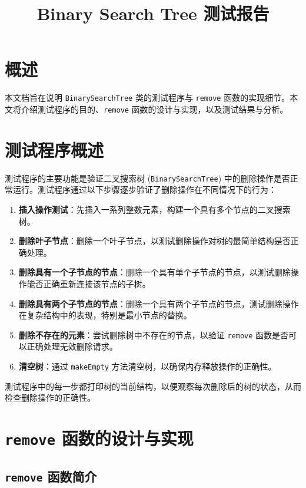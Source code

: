 \documentclass[UTF8]{ctexart}
\title{Binary Search Tree 测试报告}
\author{}
\date{}
\begin{document}
\maketitle

\section{概述}

本文档旨在说明 \texttt{BinarySearchTree} 类的测试程序与 \texttt{remove} 函数的实现细节。本文将介绍测试程序的目的、\texttt{remove} 函数的设计与实现，以及测试结果与分析。

\section{测试程序概述}

测试程序的主要功能是验证二叉搜索树 (\texttt{BinarySearchTree}) 中的删除操作是否正常运行。测试程序通过以下步骤逐步验证了删除操作在不同情况下的行为：

\begin{enumerate}
    \item \textbf{插入操作测试}：先插入一系列整数元素，构建一个具有多个节点的二叉搜索树。
    \item \textbf{删除叶子节点}：删除一个叶子节点，以测试删除操作对树的最简单结构是否正确处理。
    \item \textbf{删除具有一个子节点的节点}：删除一个具有单个子节点的节点，以测试删除操作能否正确重新连接该节点的子树。
    \item \textbf{删除具有两个子节点的节点}：删除一个具有两个子节点的节点，测试删除操作在复杂结构中的表现，特别是最小节点的替换。
    \item \textbf{删除不存在的元素}：尝试删除树中不存在的节点，以验证 \texttt{remove} 函数是否可以正确处理无效删除请求。
    \item \textbf{清空树}：通过 \texttt{makeEmpty} 方法清空树，以确保内存释放操作的正确性。
\end{enumerate}

测试程序中的每一步都打印树的当前结构，以便观察每次删除后的树的状态，从而检查删除操作的正确性。

\section{\texttt{remove} 函数的设计与实现}

\subsection{\texttt{remove} 函数简介}
\end{document}
